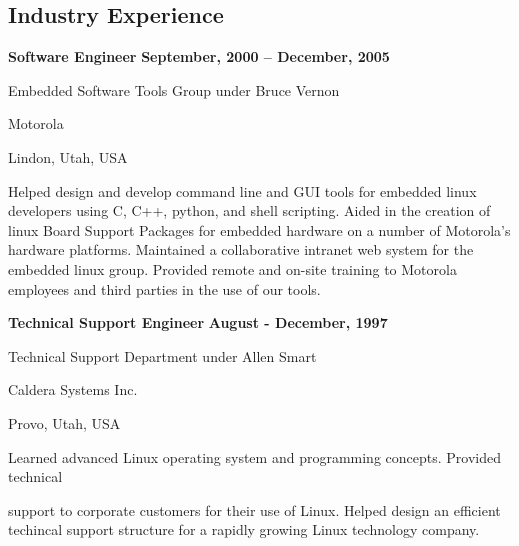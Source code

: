 \documentclass[margin,line,article]{res}
\newenvironment{list1}{
  \begin{list}{}{%
      \setlength{\itemsep}{0in}
      \setlength{\parsep}{0in} \setlength{\parskip}{0in}
      \setlength{\topsep}{0in} \setlength{\partopsep}{0in} 
      \setlength{\leftmargin}{0.17in}}}{\end{list}}
\begin{document}
\begin{resume}
\section{Industry Experience}
\textbf{Software Engineer} \hfill \textbf{September, 2000 -- December, 2005}\\
\vspace{-10pt}
\begin{list1}
\item Embedded Software Tools Group under Bruce Vernon
\item Motorola
\item Lindon, Utah, USA
\vspace{6pt}
\item Helped design and develop command line and GUI tools for embedded linux developers
using C, C++, python, and shell scripting. Aided in the creation of linux Board 
Support Packages for embedded hardware on a number of Motorola's hardware platforms. 
Maintained a collaborative intranet web system for the embedded linux group. 
Provided remote and on-site training to Motorola employees and third parties in the 
use of our tools. 
\end{list1}

\textbf{Technical Support Engineer} \hfill \textbf{August - December, 1997}\\
\vspace{-10pt}
\begin{list1}
\item Technical Support Department under Allen Smart
\item Caldera Systems Inc.
\item Provo, Utah, USA
\vspace{6pt}
\item Learned advanced Linux operating system and programming concepts. Provided technical

support to corporate customers for their use of Linux. Helped design an efficient 
techincal support structure for a rapidly growing Linux technology company.
\end{list1}



\end{resume}
\end{document}
